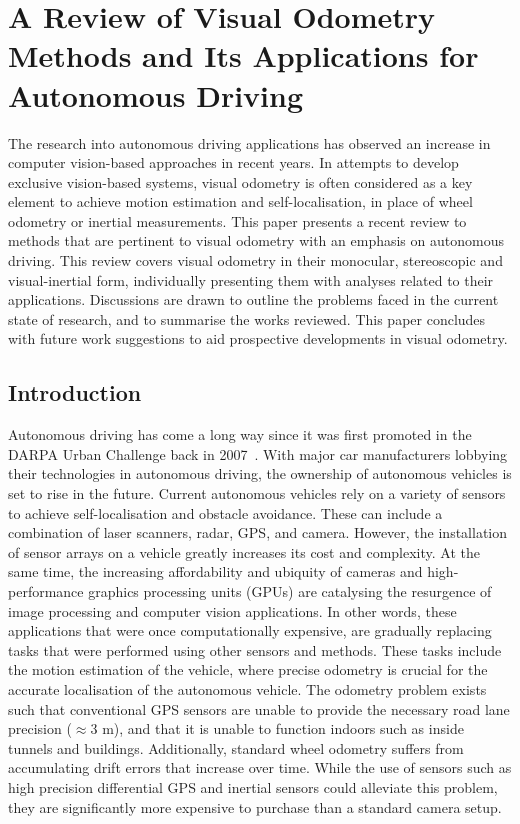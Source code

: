 
\chapter[Visual Odometry Review]{A Review of Visual Odometry Methods and Its Applications for Autonomous Driving}
\label{ch:voreview}

\ifpdf
\graphicspath{{Chapter3/Figs/Raster/}{Chapter3/Figs/PDF/}{Chapter3/Figs/}}
\else
\graphicspath{{Chapter3/Figs/Vector/}{Chapter3/Figs/}}
\fi

The research into autonomous driving applications has observed an increase in computer vision-based approaches in recent years. In attempts to develop exclusive vision-based systems, visual odometry is often considered as a key element to achieve motion estimation and self-localisation, in place of wheel odometry or inertial measurements. This paper presents a recent review to methods that are pertinent to visual odometry with an emphasis on autonomous driving. This review covers visual odometry in their monocular, stereoscopic and visual-inertial form, individually presenting them with analyses related to their applications. Discussions are drawn to outline the problems faced in the current state of research, and to summarise the works reviewed. This paper concludes with future work suggestions to aid prospective developments in visual odometry.

\section{Introduction}
Autonomous driving has come a long way since it was first promoted in the DARPA Urban Challenge back in 2007~\cite{buehler_darpa_2009}. With major car manufacturers lobbying their technologies in autonomous driving, the ownership of autonomous vehicles is set to rise in the future. Current autonomous vehicles rely on a variety of sensors to achieve self-localisation and obstacle avoidance. These can include a combination of laser scanners, radar, GPS, and camera. However, the installation of sensor arrays on a vehicle greatly increases its cost and complexity. At the same time, the increasing affordability and ubiquity of cameras and high-performance graphics processing units (GPUs) are catalysing the resurgence of image processing and computer vision applications. In other words, these applications that were once computationally expensive, are gradually replacing tasks that were performed using other sensors and methods. These tasks include the motion estimation of the vehicle, where precise odometry is crucial for the accurate localisation of the autonomous vehicle. The odometry problem exists such that conventional GPS sensors are unable to provide the necessary road lane precision ($\approx3$ m), and that it is unable to function indoors such as inside tunnels and buildings. Additionally, standard wheel odometry suffers from accumulating drift errors that increase over time. While the use of sensors such as high precision differential GPS and inertial sensors could alleviate this problem, they are significantly more expensive to purchase than a standard camera setup. 

